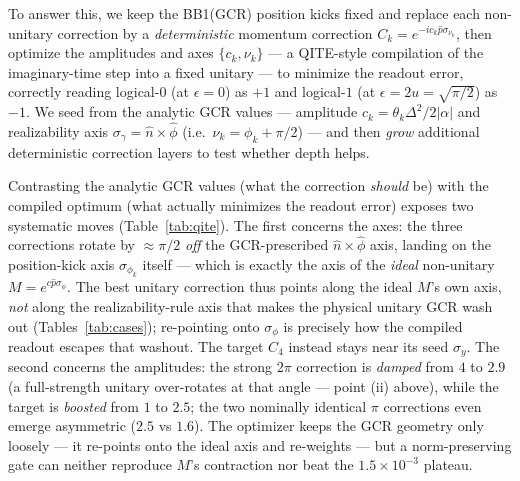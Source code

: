 \documentclass[11pt]{article}
\begin{document}
To answer this, we keep the BB1(GCR) position kicks fixed and replace each
non-unitary correction by a \emph{deterministic} momentum correction $C_k=e^{-i c_k\hat p\sigma_{\nu_k}}$,
then optimize the amplitudes and axes $\{c_k,\nu_k\}$ --- a QITE-style compilation of the imaginary-time
step into a fixed unitary --- to minimize the readout error, correctly reading logical-$0$ (at
$\epsilon=0$) as $+1$ and logical-$1$ (at $\epsilon=2u=\sqrt{\pi/2}$) as $-1$. We seed from the
analytic GCR values --- amplitude $c_k=\theta_k\Delta^2/2|\alpha|$ and realizability axis
$\sigma_\gamma=\hat n\times\hat\phi$ (i.e.\ $\nu_k=\phi_k+\pi/2$) --- and then \emph{grow} additional
deterministic correction layers to test whether depth helps.

Contrasting the analytic GCR values (what the correction \emph{should} be) with the compiled optimum
(what actually minimizes the readout error) exposes two systematic moves (Table~\ref{tab:qite}). The
first concerns the axes: the three corrections rotate by $\approx\pi/2$ \emph{off}
the GCR-prescribed $\hat n\times\hat\phi$ axis, landing on the position-kick axis $\sigma_{\phi_k}$
itself --- which is exactly the axis of the \emph{ideal} non-unitary $M=e^{c\hat p\sigma_\phi}$. The
best unitary correction thus points along the ideal $M$'s own axis, \emph{not} along the
realizability-rule axis that makes the physical unitary GCR wash out (Tables~\ref{tab:cases}); re-pointing
onto $\sigma_\phi$ is precisely how the compiled readout escapes that washout. The target $C_4$ instead
stays near its seed $\sigma_y$. The second concerns the amplitudes: the strong $2\pi$ correction is \emph{damped} from
$4$ to $2.9$ (a full-strength unitary over-rotates at that angle --- point (ii) above), while the target
is \emph{boosted} from $1$ to $2.5$; the two nominally identical $\pi$ corrections even emerge asymmetric
($2.5$ vs $1.6$). The optimizer keeps the GCR geometry only loosely --- it re-points onto the ideal axis
and re-weights --- but a norm-preserving gate can neither reproduce $M$'s contraction nor beat the
$1.5\times10^{-3}$ plateau.
\end{document}
